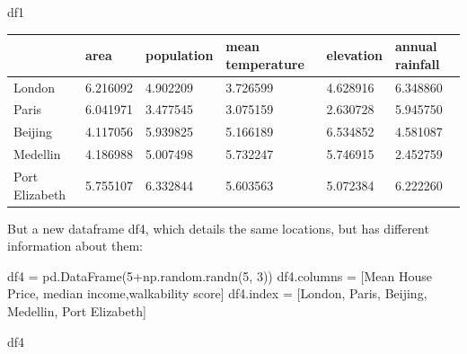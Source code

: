 \documentclass[
  letterpaper,
  DIV=11,
  numbers=noendperiod]{scrreprt}
\newenvironment{Shaded}{\begin{snugshade}}{\end{snugshade}}
\newcommand{\DecValTok}[1]{\textcolor[rgb]{0.68,0.00,0.00}{#1}}
\newcommand{\NormalTok}[1]{\textcolor[rgb]{0.00,0.23,0.31}{#1}}
\newcommand{\OperatorTok}[1]{\textcolor[rgb]{0.37,0.37,0.37}{#1}}
\newcommand{\StringTok}[1]{\textcolor[rgb]{0.13,0.47,0.30}{#1}}
\begin{document}
\begin{Shaded}
\begin{Highlighting}[]
\NormalTok{df1}
\end{Highlighting}
\end{Shaded}

\begin{longtable}[]{@{}llllll@{}}
\toprule\noalign{}
& area & population & mean temperature & elevation & annual rainfall \\
\midrule\noalign{}
\endhead
\bottomrule\noalign{}
\endlastfoot
London & 6.216092 & 4.902209 & 3.726599 & 4.628916 & 6.348860 \\
Paris & 6.041971 & 3.477545 & 3.075159 & 2.630728 & 5.945750 \\
Beijing & 4.117056 & 5.939825 & 5.166189 & 6.534852 & 4.581087 \\
Medellin & 4.186988 & 5.007498 & 5.732247 & 5.746915 & 2.452759 \\
Port Elizabeth & 5.755107 & 6.332844 & 5.603563 & 5.072384 & 6.222260 \\
\end{longtable}

But a new dataframe df4, which details the same locations, but has
different information about them:

\begin{Shaded}
\begin{Highlighting}[]
\NormalTok{df4 }\OperatorTok{=}\NormalTok{ pd.DataFrame(}\DecValTok{5}\OperatorTok{+}\NormalTok{np.random.randn(}\DecValTok{5}\NormalTok{, }\DecValTok{3}\NormalTok{))}
\NormalTok{df4.columns }\OperatorTok{=}\NormalTok{ [}\StringTok{\textquotesingle{}Mean House Price\textquotesingle{}}\NormalTok{, }\StringTok{\textquotesingle{}median income\textquotesingle{}}\NormalTok{,}\StringTok{\textquotesingle{}walkability score\textquotesingle{}}\NormalTok{]}
\NormalTok{df4.index }\OperatorTok{=}\NormalTok{ [}\StringTok{\textquotesingle{}London\textquotesingle{}}\NormalTok{, }\StringTok{\textquotesingle{}Paris\textquotesingle{}}\NormalTok{, }\StringTok{\textquotesingle{}Beijing\textquotesingle{}}\NormalTok{, }\StringTok{\textquotesingle{}Medellin\textquotesingle{}}\NormalTok{, }\StringTok{\textquotesingle{}Port Elizabeth\textquotesingle{}}\NormalTok{]}
\end{Highlighting}
\end{Shaded}

\begin{Shaded}
\begin{Highlighting}[]
\NormalTok{df4}
\end{Highlighting}
\end{Shaded}
\end{document}
